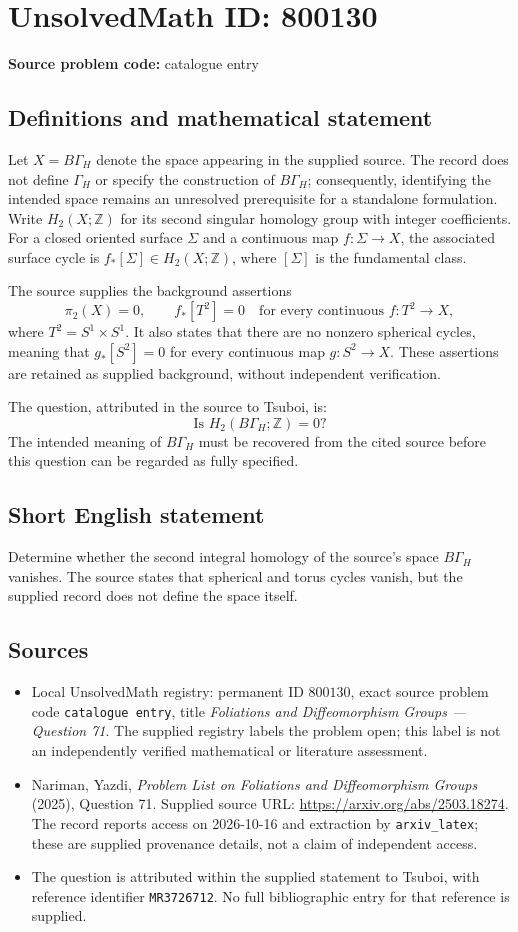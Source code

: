 \documentclass[11pt]{article}
\newcommand{\Z}{\mathbb{Z}}
\begin{document}
\section*{UnsolvedMath ID: 800130}
\textbf{Source problem code:} catalogue entry
\subsection{Definitions and mathematical statement}
Let \(X=B\Gamma_H\) denote the space appearing in the supplied source. The record does not define \(\Gamma_H\) or specify the construction of \(B\Gamma_H\); consequently, identifying the intended space remains an unresolved prerequisite for a standalone formulation. Write \(H_2(X;\Z)\) for its second singular homology group with integer coefficients. For a closed oriented surface \(\Sigma\) and a continuous map \(f\colon\Sigma\to X\), the associated surface cycle is \(f_*[\Sigma]\in H_2(X;\Z)\), where \([\Sigma]\) is the fundamental class.

The source supplies the background assertions
\[
\pi_2(X)=0,
\qquad
f_*[T^2]=0\quad\text{for every continuous }f\colon T^2\to X,
\]
where \(T^2=S^1\times S^1\). It also states that there are no nonzero spherical cycles, meaning that \(g_*[S^2]=0\) for every continuous map \(g\colon S^2\to X\). These assertions are retained as supplied background, without independent verification.

The question, attributed in the source to Tsuboi, is:
\[
\text{Is }H_2(B\Gamma_H;\Z)=0\text{?}
\]
The intended meaning of \(B\Gamma_H\) must be recovered from the cited source before this question can be regarded as fully specified.
\subsection{Short English statement}
Determine whether the second integral homology of the source's space \(B\Gamma_H\) vanishes. The source states that spherical and torus cycles vanish, but the supplied record does not define the space itself.
\subsection{Sources}
\begin{itemize}
\item Local UnsolvedMath registry: permanent ID \(800130\), exact source problem code \texttt{catalogue entry}, title \emph{Foliations and Diffeomorphism Groups --- Question 71}. The supplied registry labels the problem open; this label is not an independently verified mathematical or literature assessment.
\item Nariman, Yazdi, \emph{Problem List on Foliations and Diffeomorphism Groups} (2025), Question 71. Supplied source URL: \url{https://arxiv.org/abs/2503.18274}. The record reports access on 2026-10-16 and extraction by \texttt{arxiv\_latex}; these are supplied provenance details, not a claim of independent access.
\item The question is attributed within the supplied statement to Tsuboi, with reference identifier \texttt{MR3726712}. No full bibliographic entry for that reference is supplied.
\end{itemize}
\end{document}
